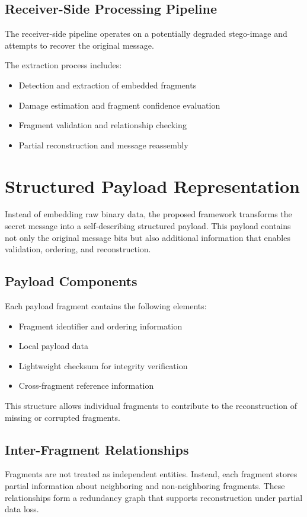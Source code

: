 \documentclass[12pt,a4paper,oneside]{report}
\begin{document}
	\subsection{Receiver-Side Processing Pipeline}
	The receiver-side pipeline operates on a potentially degraded stego-image and attempts to recover the original message.
	
	The extraction process includes:
	\begin{itemize}
		\item Detection and extraction of embedded fragments
		\item Damage estimation and fragment confidence evaluation
		\item Fragment validation and relationship checking
		\item Partial reconstruction and message reassembly
	\end{itemize}
	
	\section{Structured Payload Representation}
	Instead of embedding raw binary data, the proposed framework transforms the secret message into a self-describing structured payload. This payload contains not only the original message bits but also additional information that enables validation, ordering, and reconstruction.
	
	\subsection{Payload Components}
	Each payload fragment contains the following elements:
	\begin{itemize}
		\item Fragment identifier and ordering information
		\item Local payload data
		\item Lightweight checksum for integrity verification
		\item Cross-fragment reference information
	\end{itemize}
	
	This structure allows individual fragments to contribute to the reconstruction of missing or corrupted fragments.
	
	\subsection{Inter-Fragment Relationships}
	Fragments are not treated as independent entities. Instead, each fragment stores partial information about neighboring and non-neighboring fragments. These relationships form a redundancy graph that supports reconstruction under partial data loss.
	
\end{document}
